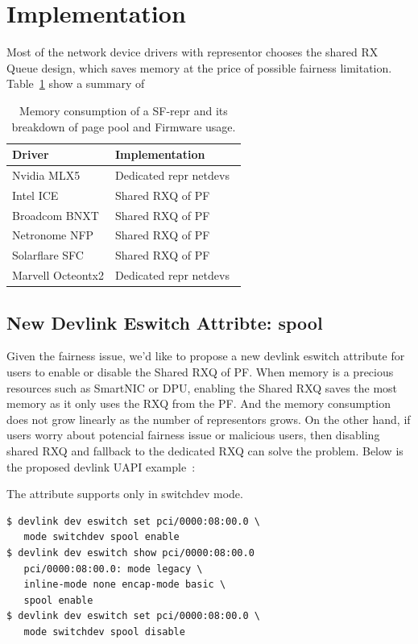 \documentclass[letterpaper]{article}
\begin{document}
\section{Implementation}
Most of the network device drivers with representor chooses the shared
RX Queue design, which saves memory at the price of possible
fairness limitation. Table~\ref{tab:vendors} show a summary of 
\begin{table}[h!]
\centering
\footnotesize
\begin{tabular}{|l|l|} \hline
\textbf{Driver} &  \textbf{Implementation}\\ \hline \hline
Nvidia MLX5 & Dedicated repr netdevs \\ \hline
Intel ICE & Shared RXQ of PF~\cite{icepatch} \\ \hline
Broadcom BNXT & Shared RXQ of PF ~\cite{survey} \\ \hline
Netronome NFP & Shared RXQ of PF~\cite{survey} \\ \hline
Solarflare SFC &  Shared RXQ of PF~\cite{survey} \\ \hline
Marvell Octeontx2 & Dedicated repr netdevs~\cite{octeontx2} \\ \hline
\end{tabular}
\caption{Memory consumption of a SF-repr and its breakdown of page pool and Firmware usage.}
\label{tab:vendors}
\end{table}

\subsection{New Devlink Eswitch Attribte: spool}
Given the fairness issue, we'd like to propose a new devlink eswitch attribute
for users to enable or disable the Shared RXQ of PF.
When memory is a precious resources such as SmartNIC or DPU, enabling the Shared RXQ
saves the most memory as it only uses the RXQ from the PF. And the memory consumption
does not grow linearly as the number of representors grows.
On the other hand, if users worry about potencial fairness issue or malicious users,
then disabling shared RXQ and fallback to the dedicated RXQ can solve the problem.
Below is the proposed devlink UAPI example~\cite{spool}:

The attribute supports only in switchdev mode.
\begin{verbatim}
$ devlink dev eswitch set pci/0000:08:00.0 \
   mode switchdev spool enable
$ devlink dev eswitch show pci/0000:08:00.0
   pci/0000:08:00.0: mode legacy \
   inline-mode none encap-mode basic \
   spool enable
$ devlink dev eswitch set pci/0000:08:00.0 \
   mode switchdev spool disable
\end{verbatim}
\end{document}
